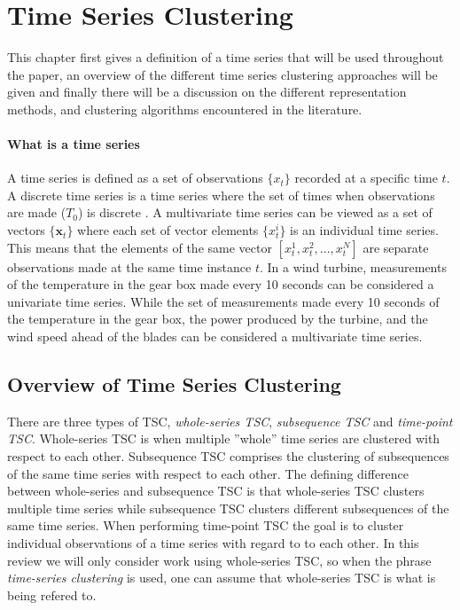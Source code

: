 \chapter{Time Series Clustering}

This chapter first gives a definition of a time series that will be used throughout the paper, an overview of the different time series clustering approaches will be given and finally there will be a discussion on the different representation methods, and clustering algorithms encountered in the literature. 

\subsubsection*{What is a time series} 
A time series is defined as a set of observations $\{x_t\}$ recorded at a specific time $t$. 
A discrete time series is a time series where the set of times when observations are made ($T_0$) is discrete \cite{brockwell_davis_advanced}. 
A multivariate time series can be viewed as a set of vectors $\{\mathbf{x}_t\}$ where each set of vector elements $\{x^i_t\}$ is an individual time series. 
This means that the elements of the same vector $[x^1_t, x^2_t,...,x^N_t]$ are separate observations made at the same time instance $t$. 
In a wind turbine, measurements of the temperature in the gear box made every 10 seconds can be considered a univariate time series. 
While the set of measurements made every 10 seconds of the temperature in the gear box, the power produced by the turbine, and the wind speed ahead of the blades can be considered a multivariate time series. \bigskip

\section{Overview of Time Series Clustering}
There are three types of TSC, \textit{whole-series TSC}, \textit{subsequence TSC} and \textit{time-point TSC}. 
Whole-series TSC is when multiple ''whole'' time series are clustered with respect to each other. 
Subsequence TSC comprises the clustering of subsequences of the same time series with respect to each other. 
The defining difference between whole-series and subsequence TSC is that whole-series TSC clusters multiple time series while subsequence TSC clusters different subsequences of the same time series. 
When performing time-point TSC the goal is to cluster individual observations of a time series with regard to to each other. 
In this review we will only consider work using whole-series TSC, so when the phrase \textit{time-series clustering} is used, one can assume that whole-series TSC is what is being refered to. \bigskip

